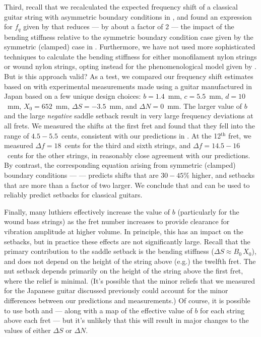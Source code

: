 Third, recall that we recalculated the expected frequency shift of a classical guitar string with asymmetric boundary conditions in , and found an expression for $f_q$ given by  that reduces --- by about a factor of 2 --- the impact of the bending stiffness relative to the symmetric boundary condition case given by the symmetric (clamped) case in . Furthermore, we have not used more sophisticated techniques to calculate the bending stiffness for either monofilament nylon strings or wound nylon strings, opting instead for the phenomenological model given by . But is this approach valid? As a test, we compared our frequency shift estimates based on  with experimental measurements made using a guitar manufactured in Japan based on a few unique design choices: $b = 1.4$~mm, $c = 5.5$~mm, $d = 10$~mm, $X_0 = 652$~mm, $\Delta S = -3.5$~mm, and $\Delta N = 0$~mm. The larger value of $b$ and the large \emph{negative} saddle setback result in very large frequency deviations at all frets. We measured the shifts at the first fret and found that they fell into the range of $4.5 - 5.5$~cents, consistent with our predictions in . At the 12$^\mathrm{th}$ fret, we measured $\Delta f = 18$~cents for the third and sixth strings, and $\Delta f = 14.5 - 16$~cents for the other strings, in reasonably close agreement with our predictions. By contrast, the corresponding equation arising from symmetric (clamped) boundary conditions ---  --- predicts shifts that are $30 - 45$\% higher, and setbacks that are more than a factor of two larger. We conclude that  and  can be used to reliably predict setbacks for classical guitars.

Finally, many luthiers effectively increase the value of $b$ (particularly for the wound bass strings) as the fret number increases to provide clearance for vibration amplitude at higher volume. In principle, this has an impact on the setbacks, but in practice these effects are not significantly large. Recall that the primary contribution to the saddle setback is the bending stiffness ($\Delta S \approx B_0\, X_0$), and does not depend on the height of the string above (e.g.) the twelfth fret. The nut setback depends primarily on the height of the string above the first fret, where the relief is minimal. (It's possible that the minor reliefs that we measured for the Japanese guitar discussed previously could account for the minor differences between our predictions and measurements.) Of course, it is possible to use both  and  --- along with a map of the effective value of $b$ for each string above each fret --- but it's unlikely that this will result in major changes to the values of either $\Delta S$ or $\Delta N$. 
